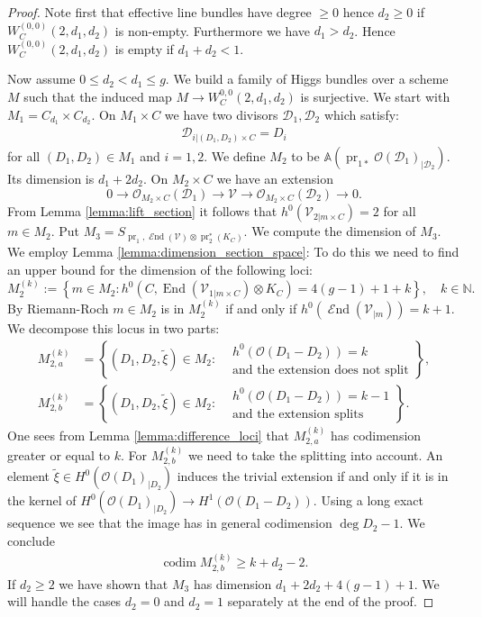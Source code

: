 \documentclass[10pt,a4paper]{amsart}
\DeclareMathOperator{\End}{\mathcal{E}nd}
\newcommand{\Aff}{\mathbb{A}}
\newcommand{\NN}{\mathbb{N}}
\newcommand{\OO}{\mathcal{O}}
\newcommand{\cD}{\mathcal{D}}
\newcommand{\cV}{\mathcal{V}}
\newcommand{\op}{\operatorname}
\renewcommand{\tilde}{\widetilde}		%
\begin{document}
\begin{proof}
Note first that effective line bundles have degree $\geq 0$ hence $d_2 \geq 0$ if $W^{(0,0)}_C(2,d_1,d_2)$ is non-empty. Furthermore we have $d_1 > d_2$. Hence $W^{(0,0)}_C(2,d_1,d_2)$ is empty if $d_1 + d_2 < 1$.

Now assume $0 \leq d_2< d_1 \leq g$.
We build a family of Higgs bundles over a scheme $M$ such that the induced map $M \to W_C^{0,0}(2,d_1,d_2)$ is surjective. We start with $M_1 = C_{d_1}\times C_{d_2}$. On $M_1 \times C$ we have two divisors $\cD_1,\cD_2$ which satisfy:
\begin{align*}
 \cD_{i|(D_1,D_2)\times C} = D_i
\end{align*}
for all $(D_1,D_2) \in M_1$ and $i =1,2$. We define $M_2$ to be $\Aff(\op{pr}_{1*}\OO(\cD_1)_{|\cD_2})$. Its dimension is $d_1 + 2d_2$. On $M_2 \times C$ we have an extension 
\begin{equation}\label{eq:univ_extension_ii}
0 \to \OO_{M_2\times C}(\cD_1) \to \cV \to \OO_{M_2\times C}(\cD_2) \to 0.
\end{equation}
 From Lemma \ref{lemma:lift_section} it follows that $h^0(\cV_{2|m\times C}) = 2$ for all $m \in M_2$. Put $M_3 = S_{\op{pr}_1,\End(\cV)\otimes \op{pr}_2^*(K_C)}$. We compute the dimension of $M_3$. We employ Lemma \ref{lemma:dimension_section_space}: To do this we need to find an upper bound for the dimension of the following loci:
\begin{equation*}
M_2^{(k)} := \left\{ m \in M_2 :  h^0(C,\op{End}\left(\cV_{1|m\times C}\right)\otimes K_C) = 4(g-1)+1+k\right\},\quad k\in \NN. 
\end{equation*}
By Riemann-Roch $m\in M_2$ is in $M_2^{(k)}$ if and only if $h^0(\End(\cV_{|m}))= k+1$. We decompose this locus in two parts:
\begin{align*}
M_{2,a}^{(k)} &= \left\{(D_1,D_2,\tilde{\xi}) \in M_2 : \begin{aligned}
&h^0(\OO(D_1-D_2)) = k \\
&\text{and the extension does not split}
\end{aligned} \right\},\\
M_{2,b}^{(k)} &= \left\{(D_1,D_2,\tilde{\xi}) \in M_2 : \begin{aligned}
&h^0(\OO(D_1-D_2)) = k-1 \\
&\text{and the extension splits}
\end{aligned} \right\}.
\end{align*}
One sees from Lemma \ref{lemma:difference_loci} that $M^{(k)}_{2,a}$ has codimension greater or equal to $k$. For $M^{(k)}_{2,b}$ we need to take the splitting into account. An element $\tilde{\xi}\in H^0(\OO(D_1)_{|D_2})$ induces the trivial extension if and only if it is in the kernel of $H^0(\OO(D_1)_{|D_2})\to H^1(\OO(D_1-D_2))$. Using a long exact sequence we see that the image has in general codimension $\deg D_2 -1$. 
We conclude 
\begin{align*}
\op{codim} M_{2,b}^{(k)} \geq k+d_2 - 2.
\end{align*}
If $d_2 \geq 2$ we have shown that $M_3$ has dimension $d_1 +2d_2 + 4(g-1)+1$. We will handle the cases $d_2 = 0$ and $d_2 = 1$ separately at the end of the proof. 


\end{proof}
\end{document}
